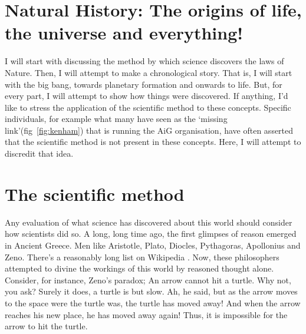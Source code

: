   
\begin{multicols}{2}
\section{Natural History: The origins of life, the universe and everything!}


I will start with discussing the method by which science discovers the laws of Nature. Then, I will attempt to make a chronological story. That is, I will start with the big bang, towards planetary formation and onwards to life. But, for every part, I will attempt to show how things were discovered. If anything, I'd like to stress the application of the scientific method to these concepts. Specific individuals, for example what many have seen as the ‘missing link’(fig~\ref{fig:kenham}) that is running the AiG organisation, have often asserted that the scientific method is not present in these concepts. Here, I will attempt to discredit that idea.

\section{The scientific method}
Any evaluation of what science has discovered about this world should consider how scientists did so. A long, long time ago, the first glimpses of reason emerged in Ancient Greece. Men like Aristotle, Plato, Diocles, Pythagoras, Apollonius and Zeno. There's a reasonably long list on Wikipedia \cite{philosophers}. Now, these philosophers attempted to divine the workings of this world by reasoned thought alone. Consider, for instance, Zeno's paradox; An arrow cannot hit a turtle. Why not, you ask? Surely it does, a turtle is but slow. Ah, he said, but as the arrow moves to the space were the turtle was, the turtle has moved away! And when the arrow reaches his new place, he has moved away again! Thus, it is impossible for the arrow to hit the turtle.


\end{multicols}
